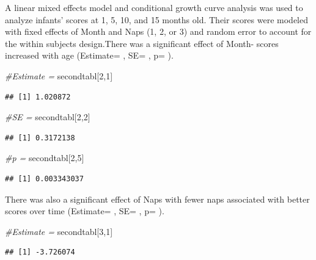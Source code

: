 \documentclass[]{book}
\newenvironment{Shaded}{\begin{snugshade}}{\end{snugshade}}
\newcommand{\CommentTok}[1]{\textcolor[rgb]{0.56,0.35,0.01}{\textit{#1}}}
\newcommand{\DecValTok}[1]{\textcolor[rgb]{0.00,0.00,0.81}{#1}}
\newcommand{\NormalTok}[1]{#1}
\begin{document}
A linear mixed effects model and conditional growth curve analysis was used to analyze infants' scores at 1, 5, 10, and 15 months old. Their scores were modeled with fixed effects of Month and Naps (1, 2, or 3) and random error to account for the within subjects design.There was a significant effect of Month- scores increased with age (Estimate= , SE= , p= ).

\begin{Shaded}
\begin{Highlighting}[]
\CommentTok{#Estimate = }
\NormalTok{secondtabl[}\DecValTok{2}\NormalTok{,}\DecValTok{1}\NormalTok{]}
\end{Highlighting}
\end{Shaded}

\begin{verbatim}
## [1] 1.020872
\end{verbatim}

\begin{Shaded}
\begin{Highlighting}[]
\CommentTok{#SE = }
\NormalTok{secondtabl[}\DecValTok{2}\NormalTok{,}\DecValTok{2}\NormalTok{]}
\end{Highlighting}
\end{Shaded}

\begin{verbatim}
## [1] 0.3172138
\end{verbatim}

\begin{Shaded}
\begin{Highlighting}[]
\CommentTok{#p = }
\NormalTok{secondtabl[}\DecValTok{2}\NormalTok{,}\DecValTok{5}\NormalTok{]}
\end{Highlighting}
\end{Shaded}

\begin{verbatim}
## [1] 0.003343037
\end{verbatim}

There was also a significant effect of Naps with fewer naps associated with better scores over time (Estimate= , SE= , p= ).

\begin{Shaded}
\begin{Highlighting}[]
\CommentTok{#Estimate = }
\NormalTok{secondtabl[}\DecValTok{3}\NormalTok{,}\DecValTok{1}\NormalTok{]}
\end{Highlighting}
\end{Shaded}

\begin{verbatim}
## [1] -3.726074
\end{verbatim}
\end{document}
